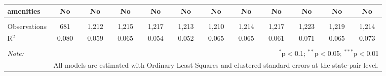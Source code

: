 \begin{table}[!htbp]
\begin{tabular}{@{\extracolsep{5pt}}lccccccccccc}
amenities & No & No & No & No & No & No & No & No & No & No & No \\ 
\hline \\[-1.8ex] 
Observations & 681 & 1,212 & 1,215 & 1,217 & 1,213 & 1,210 & 1,214 & 1,217 & 1,223 & 1,219 & 1,214 \\ 
R$^{2}$ & 0.080 & 0.059 & 0.065 & 0.054 & 0.052 & 0.065 & 0.065 & 0.061 & 0.071 & 0.065 & 0.073 \\ 
\hline 
\hline \\[-1.8ex] 
\textit{Note:}  & \multicolumn{11}{r}{$^{*}$p$<$0.1; $^{**}$p$<$0.05; $^{***}$p$<$0.01} \\ 
 & \multicolumn{11}{r}{All models are estimated with Ordinary Least Squares and clustered standard errors at the state-pair level.} \\ 
\end{tabular} 
\end{table} 
